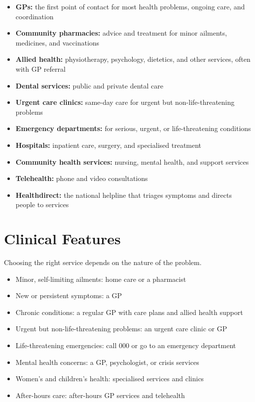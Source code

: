 \begin{itemize}
    \item \textbf{GPs:} the first point of contact for most health problems, ongoing care, and coordination
    \item \textbf{Community pharmacies:} advice and treatment for minor ailments, medicines, and vaccinations
    \item \textbf{Allied health:} physiotherapy, psychology, dietetics, and other services, often with GP referral
    \item \textbf{Dental services:} public and private dental care
    \item \textbf{Urgent care clinics:} same-day care for urgent but non-life-threatening problems
    \item \textbf{Emergency departments:} for serious, urgent, or life-threatening conditions
    \item \textbf{Hospitals:} inpatient care, surgery, and specialised treatment
    \item \textbf{Community health services:} nursing, mental health, and support services
    \item \textbf{Telehealth:} phone and video consultations
    \item \textbf{Healthdirect:} the national helpline that triages symptoms and directs people to services
\end{itemize}

\section*{Clinical Features}
Choosing the right service depends on the nature of the problem.

\begin{itemize}
    \item Minor, self-limiting ailments: home care or a pharmacist
    \item New or persistent symptoms: a GP
    \item Chronic conditions: a regular GP with care plans and allied health support
    \item Urgent but non-life-threatening problems: an urgent care clinic or GP
    \item Life-threatening emergencies: call 000 or go to an emergency department
    \item Mental health concerns: a GP, psychologist, or crisis services
    \item Women's and children's health: specialised services and clinics
    \item After-hours care: after-hours GP services and telehealth
\end{itemize}


